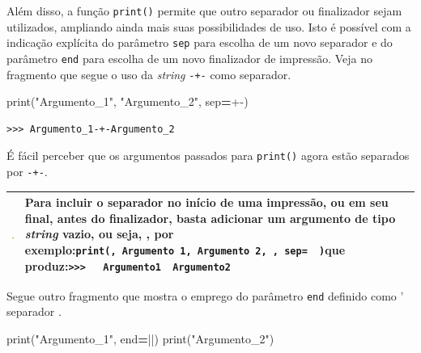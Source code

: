 \documentclass[
]{book}
\newenvironment{Shaded}{\begin{snugshade}}{\end{snugshade}}
\newcommand{\BuiltInTok}[1]{#1}
\newcommand{\NormalTok}[1]{#1}
\newcommand{\OperatorTok}[1]{\textcolor[rgb]{0.81,0.36,0.00}{\textbf{#1}}}
\newcommand{\StringTok}[1]{\textcolor[rgb]{0.31,0.60,0.02}{#1}}
\begin{document}
Além disso, a função \texttt{print()} permite que outro separador ou finalizador sejam utilizados, ampliando ainda mais suas possibilidades de uso. Isto é possível com a indicação explícita do parâmetro \texttt{sep} para escolha de um novo separador e do parâmetro \texttt{end} para escolha de um novo finalizador de impressão. Veja no fragmento que segue o uso da \emph{string} \texttt{-+-} como separador.

\begin{Shaded}
\begin{Highlighting}[]
\BuiltInTok{print}\NormalTok{(}\StringTok{"Argumento\_1"}\NormalTok{, }\StringTok{"Argumento\_2"}\NormalTok{, sep}\OperatorTok{=}\StringTok{\textquotesingle{}{-}+{-}\textquotesingle{}}\NormalTok{)}
\end{Highlighting}
\end{Shaded}

\begin{verbatim}
>>> Argumento_1-+-Argumento_2
\end{verbatim}

É fácil perceber que os argumentos passados para \texttt{print()} agora estão separados por \texttt{-+-}.

\begin{longtable}[]{@{}
  >{\centering\arraybackslash}p{}
  >{\raggedright\arraybackslash}p{}@{}}
\toprule
\includegraphics{images/do.png} & Para incluir o separador no início de uma impressão, ou em seu final, antes do finalizador, basta adicionar um argumento de tipo \emph{string} vazio, ou seja, \texttt{\textquotesingle{}\textquotesingle{}}, por exemplo:\texttt{print(\textquotesingle{}\textquotesingle{},\ \textquotesingle{}Argumento\ 1\textquotesingle{},\ \textquotesingle{}Argumento\ 2\textquotesingle{},\ \textquotesingle{}\textquotesingle{},\ sep=\textquotesingle{}\ \textbar{}\ \textquotesingle{})}que produz:\texttt{\textgreater{}\textgreater{}\textgreater{}\ \ \textbar{}\ Argumento1\ \textbar{}\ Argumento2\ \textbar{}} \\
\midrule
\endhead
\bottomrule
\end{longtable}

Segue outro fragmento que mostra o emprego do parâmetro \texttt{end} definido como ' separador \texttt{\textbar{}\textbar{}}.

\begin{Shaded}
\begin{Highlighting}[]
\BuiltInTok{print}\NormalTok{(}\StringTok{"Argumento\_1"}\NormalTok{, end}\OperatorTok{=}\StringTok{\textquotesingle{}||\textquotesingle{}}\NormalTok{)}
\BuiltInTok{print}\NormalTok{(}\StringTok{"Argumento\_2"}\NormalTok{)}
\end{Highlighting}
\end{Shaded}
\end{document}
